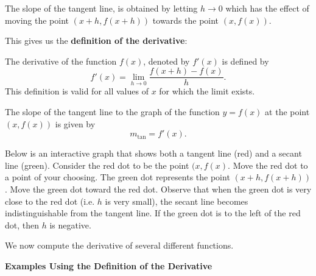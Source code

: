 \documentclass{ximera}
\begin{document}
The slope of the tangent line, is obtained by letting $h \to 0$ which has the effect of 
moving the point $(x+h, f(x+h))$ towards the point 
$(x, f(x))$.  


This gives us the \textbf{definition of the derivative}:

\begin{definition}[Derivative]
The derivative of the function $f(x)$, denoted by $f'(x)$ is defined by
\[f'(x) = \lim_{h \to 0} \frac{f(x+h)-f(x)}{h}.\]
This definition is valid for all values of $x$ for which the limit exists.
\end{definition}


The slope of the tangent line to the graph of the function $y=f(x)$ at the point $(x,f(x))$
is given by
\[
m_{\text{tan}}= f'(x).
\]

Below is an interactive graph that shows both a tangent line (red) and a secant line (green).
Consider the red dot to be the point $(x, f(x)$. Move the red dot to a point of your choosing.
The green dot represents the point $(x+h, f(x+h))$. Move the green dot toward the red dot.
Observe that when the green dot is very close to the red dot (i.e. $h$ is very small), 
the secant line becomes indistinguishable from the tangent line. If the green dot is to the left of 
the red dot, then $h$ is negative.






We now compute the derivative of several different functions.\\

\begin{center}
\textbf{Examples Using the Definition of the Derivative}
\end{center}
\end{document}
